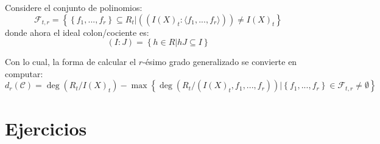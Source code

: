 \documentclass[12pt]{report}
\theoremstyle{largebreak}
\begin{document}
    Considere el conjunto de polinomios:
    \begin{equation*}
        \mathcal{F}_{ t,r}=\left\{\left\{f_1,...,f_r \right\}\subseteq R_t \Big|((I(X)_t:\langle f_1,...,f_r\rangle))\neq I(X)_t \right\}
    \end{equation*}
    donde ahora el ideal colon/cociente es:
    \begin{equation*}
        (I:J)=\left\{h\in R\Big|hJ\subseteq I \right\}
    \end{equation*}

    Con lo cual, la forma de calcular el $r$-ésimo grado generalizado se convierte en computar:
    \begin{equation*}
        d_r(\mathcal{C})=\deg\left(R_t/I(X)_t \right)-\max\left\{\deg\left(R_t/(I(X)_t,f_1,...,f_r) \right)\Big|\left\{f_1,...,f_r \right\}\in\mathcal{F}_{ t,r}\neq\emptyset \right\}
    \end{equation*}

    \newpage

    \section{Ejercicios}

    
\end{document}
